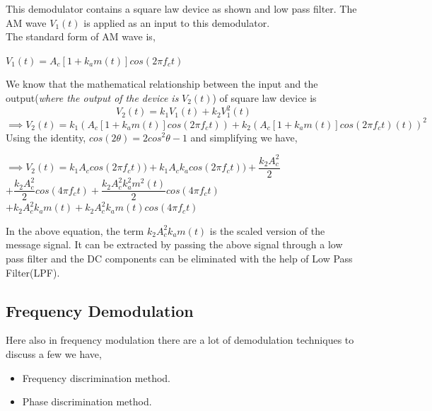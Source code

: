\documentclass[12pt,a4paper]{article}%
\begin{document}
\begin{flushleft}
\begin{flushleft}
\begin{flushleft}
				This demodulator contains a square law device as shown and low pass filter. The AM wave $V_1 (t)$ is applied as an input to this demodulator.\\
				The standard form of AM wave is,\\
				\begin{center}
					$V_1 (t) = A_c [1+k_a m(t)]cos(2 \pi f_c t)$
				\end{center} 
				We know that the mathematical relationship between the input and the output(\textit{where the output of the device is} $V_2 (t)$) of square law device is \\
				\begin{equation}
				V_2 (t) = k_1 V_1 (t) + k_2 V_1 ^ {2} (t)
				\end{equation}
				\begin{equation}
				\implies V_2 (t) = k_1 ( A_c [1+k_a m(t)]cos(2 \pi f_c t) ) + k_2 ( A_c [1+k_a m(t)]cos(2 \pi f_c t) (t) ) ^ {2} 
				\end{equation}
				Using the identity, $cos(2\theta)=2cos^{2}\theta -1$ and simplifying we have,
				\begin{center}
					$\implies V_2 (t) = k_1 A_c cos(2 \pi f_c t) ) + k_1 A_c k_a cos(2 \pi f_c t) ) + \dfrac{k_2 A_c ^2}{2}  
					$\\$+ \dfrac{k_2 A_c ^2}{2} cos(4 \pi f_c t) + \dfrac{k_2 A_c ^2 k_a^2 m^2 (t)}{2} cos(4 \pi f_c t)$\\$ + k_2 A_c^2 k_a m(t) + k_2 A_c^2 k_a m(t) cos(4 \pi f_c t)$
				\end{center}
				In the above equation, the term $k_2 A_c^2 k_a m(t)$ is the scaled version of the message signal. It can be extracted by passing the above signal through a low pass filter and the DC components can be eliminated with the help of Low Pass Filter(LPF).
				\subsection{Frequency Demodulation }
				\begin{flushleft}
					Here also in frequency modulation there are a lot of demodulation techniques to discuss a few we have,\\\smallskip
					\begin{itemize}
						\item{Frequency discrimination method.}
						\item{Phase discrimination method.}
					\end{itemize}

\end{flushleft}
\end{flushleft}
\end{flushleft}
\end{flushleft}
\end{document}
